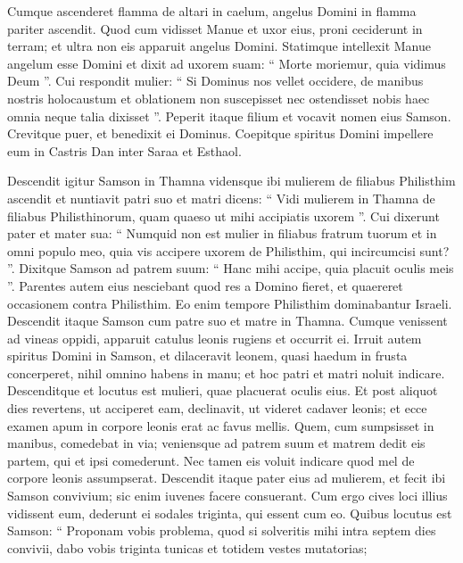 \begin{biblechapter}
\begin{biblechapter}
\begin{biblechapter}
\begin{biblechapter}
\begin{biblechapter}
\begin{biblechapter}
\begin{biblechapter}
\begin{biblechapter}
\begin{biblechapter}
\begin{biblechapter}
\begin{biblechapter}
\begin{biblechapter}
\begin{biblechapter}
\verse Cumque ascenderet flamma de altari in caelum, angelus Domini in flamma pariter ascendit. Quod cum vidisset Manue et uxor eius, proni ceciderunt in terram; 
 \verse et ultra non eis apparuit angelus Domini. Statimque intellexit Manue angelum esse Domini 
\verse et dixit ad uxorem suam: “ Morte moriemur, quia vidimus Deum ”. 
\verse Cui respondit mulier: “ Si Dominus nos vellet occidere, de manibus nostris holocaustum et oblationem non suscepisset nec ostendisset nobis haec omnia neque talia dixisset ”.
 \verse Peperit itaque filium et vocavit nomen eius Samson. Crevitque puer, et benedixit ei Dominus. 
\verse Coepitque spiritus Domini impellere eum in Castris Dan inter Saraa et Esthaol.
 
\begin{biblechapter}
\verse Descendit igitur Samson in Thamna vidensque ibi mulierem de filiabus Philisthim 
\verse ascendit et nuntiavit patri suo et matri dicens: “ Vidi mulierem in Thamna de filiabus Philisthinorum, quam quaeso ut mihi accipiatis uxorem ”. 
\verse Cui dixerunt pater et mater sua: “ Numquid non est mulier in filiabus fratrum tuorum et in omni populo meo, quia vis accipere uxorem de Philisthim, qui incircumcisi sunt? ”. Dixitque Samson ad patrem suum: “ Hanc mihi accipe, quia placuit oculis meis ”. 
\verse Parentes autem eius nesciebant quod res a Domino fieret, et quaereret occasionem contra Philisthim. Eo enim tempore Philisthim dominabantur Israeli.
 \verse Descendit itaque Samson cum patre suo et matre in Thamna. Cumque venissent ad vineas oppidi, apparuit catulus leonis rugiens et occurrit ei. 
\verse Irruit autem spiritus Domini in Samson, et dilaceravit leonem, quasi haedum in frusta concerperet, nihil omnino habens in manu; et hoc patri et matri noluit indicare. 
\verse Descenditque et locutus est mulieri, quae placuerat oculis eius. 
\verse Et post aliquot dies revertens, ut acciperet eam, declinavit, ut videret cadaver leonis; et ecce examen apum in corpore leonis erat ac favus mellis. 
\verse Quem, cum sumpsisset in manibus, comedebat in via; veniensque ad patrem suum et matrem dedit eis partem, qui et ipsi comederunt. Nec tamen eis voluit indicare quod mel de corpore leonis assumpserat.
 \verse Descendit itaque pater eius ad mulierem, et fecit ibi Samson convivium; sic enim iuvenes facere consuerant. 
\verse Cum ergo cives loci illius vidissent eum, dederunt ei sodales triginta, qui essent cum eo. 
\verse Quibus locutus est Samson: “ Proponam vobis problema, quod si solveritis mihi intra septem dies convivii, dabo vobis triginta tunicas et totidem vestes mutatorias; 

\end{biblechapter}
\end{biblechapter}
\end{biblechapter}
\end{biblechapter}
\end{biblechapter}
\end{biblechapter}
\end{biblechapter}
\end{biblechapter}
\end{biblechapter}
\end{biblechapter}
\end{biblechapter}
\end{biblechapter}
\end{biblechapter}
\end{biblechapter}
